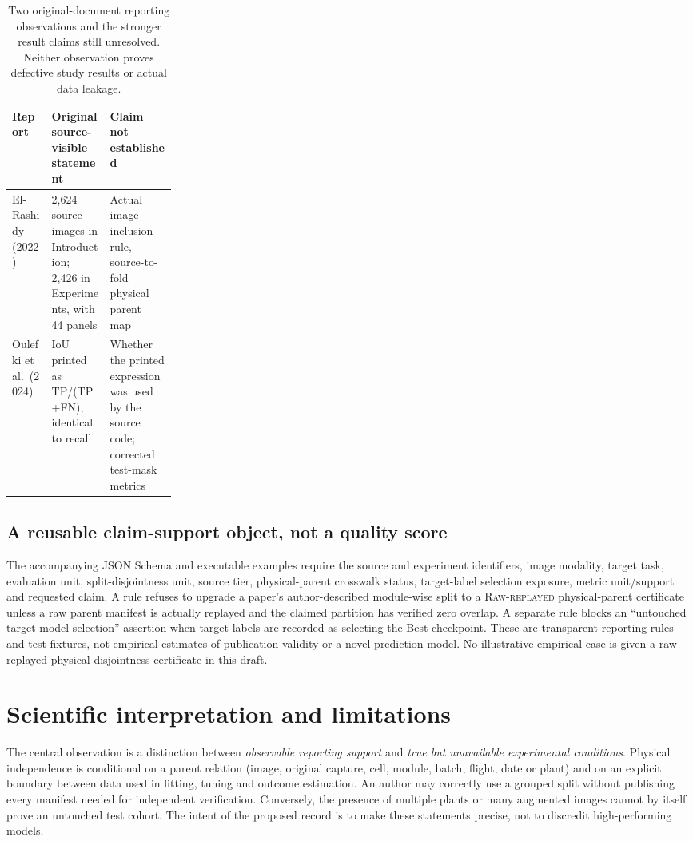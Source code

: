 \documentclass[10pt,a4paper]{article}
\newcommand{\raw}{\textsc{Raw-replayed}}
\begin{document}
\begin{table}[t]
\centering\small
\caption{Two original-document reporting observations and the stronger result claims still unresolved. Neither observation proves defective study results or actual data leakage.}
\begin{tabularx}{\linewidth}{@{}p{0.24\linewidth}XX@{}}
\toprule
Report & Original source-visible statement & Claim not established \\
\midrule
El-Rashidy (2022) & 2,624 source images in Introduction; 2,426 in Experiments, with 44 panels & Actual image inclusion rule, source-to-fold physical parent map \\
Oulefki et al.\ (2024) & IoU printed as TP/(TP+FN), identical to recall & Whether the printed expression was used by the source code; corrected test-mask metrics \\
\bottomrule
\end{tabularx}
\end{table}

\subsection{A reusable claim-support object, not a quality score}
The accompanying JSON Schema and executable examples require the source and experiment identifiers, image modality, target task, evaluation unit, split-disjointness unit, source tier, physical-parent crosswalk status, target-label selection exposure, metric unit/support and requested claim. A rule refuses to upgrade a paper's author-described module-wise split to a \raw{} physical-parent certificate unless a raw parent manifest is actually replayed and the claimed partition has verified zero overlap. A separate rule blocks an ``untouched target-model selection'' assertion when target labels are recorded as selecting the Best checkpoint. These are transparent reporting rules and test fixtures, not empirical estimates of publication validity or a novel prediction model. No illustrative empirical case is given a raw-replayed physical-disjointness certificate in this draft.

\section{Scientific interpretation and limitations}
The central observation is a distinction between \emph{observable reporting support} and \emph{true but unavailable experimental conditions}. Physical independence is conditional on a parent relation (image, original capture, cell, module, batch, flight, date or plant) and on an explicit boundary between data used in fitting, tuning and outcome estimation. An author may correctly use a grouped split without publishing every manifest needed for independent verification. Conversely, the presence of multiple plants or many augmented images cannot by itself prove an untouched test cohort. The intent of the proposed record is to make these statements precise, not to discredit high-performing models.
\end{document}
